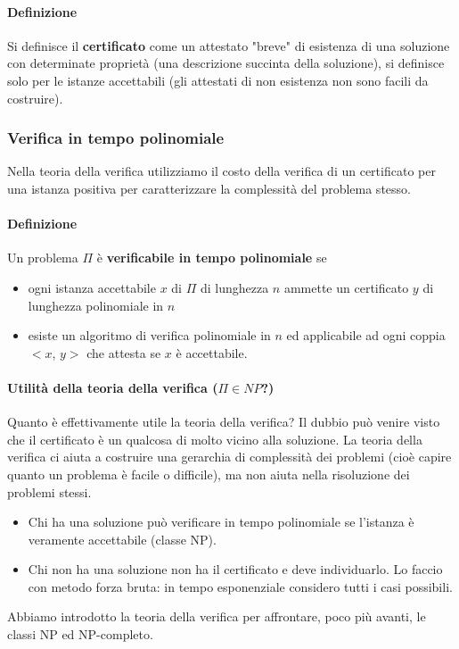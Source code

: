 \paragraph{Definizione} Si definisce il \textbf{certificato} come un attestato "breve" di esistenza di una soluzione con determinate proprietà (una descrizione succinta della soluzione), si definisce solo per le istanze accettabili (gli attestati di non esistenza non sono facili da costruire).

\subsubsection{Verifica in tempo polinomiale}
Nella teoria della verifica utilizziamo il costo della verifica di un certificato per una istanza positiva per caratterizzare la complessità del problema stesso. \paragraph{Definizione} Un problema $\Pi$ è \textbf{verificabile in tempo polinomiale} se
\begin{itemize}
	\item ogni istanza accettabile $x$ di $\Pi$ di lunghezza $n$ ammette un certificato $y$ di lunghezza polinomiale in $n$
	\item esiste un algoritmo di verifica polinomiale in $n$ ed applicabile ad ogni coppia \\$<x$, $y>$ che attesta se $x$ è accettabile.
\end{itemize}
\paragraph{Utilità della teoria della verifica ($\Pi \in NP$?)}  Quanto è effettivamente utile la teoria della verifica? Il dubbio può venire visto che il certificato è un qualcosa di molto vicino alla soluzione. La teoria della verifica ci aiuta a costruire una gerarchia di complessità dei problemi (cioè capire quanto un problema è facile o difficile), ma non aiuta nella risoluzione dei problemi stessi.
\begin{itemize}
	\item Chi ha una soluzione può verificare in tempo polinomiale se l’istanza è veramente accettabile (classe NP).
	\item Chi non ha una soluzione non ha il certificato e deve individuarlo. Lo faccio con metodo forza bruta: in tempo esponenziale considero tutti i casi possibili. 
\end{itemize}
Abbiamo introdotto la teoria della verifica per affrontare, poco più avanti, le classi NP ed NP-completo.


